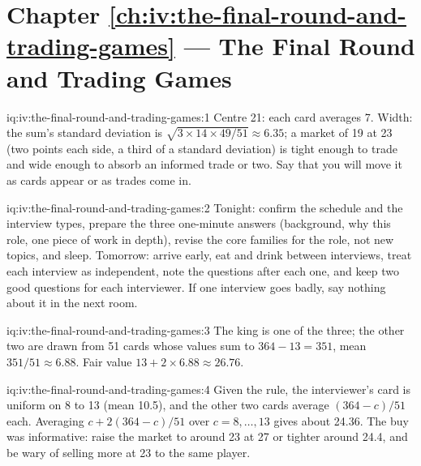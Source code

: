 \section*{Chapter \ref{ch:iv:the-final-round-and-trading-games} --- The Final Round and Trading Games}

\begin{solution}{iq:iv:the-final-round-and-trading-games:1}
Centre 21: each card averages 7. Width: the sum's standard deviation is $\sqrt{3 \times 14 \times 49/51}
\approx 6.35$; a market of 19 at 23 (two points each side, a third of a standard deviation) is tight enough to
trade and wide enough to absorb an informed trade or two. Say that you will move it as cards appear or as
trades come in.
\end{solution}

\begin{solution}{iq:iv:the-final-round-and-trading-games:2}
Tonight: confirm the schedule and the interview types, prepare the three one-minute answers (background, why
this role, one piece of work in depth), revise the core families for the role, not new topics, and sleep.
Tomorrow: arrive early, eat and drink between interviews, treat each interview as independent, note the
questions after each one, and keep two good questions for each interviewer. If one interview goes badly, say
nothing about it in the next room.
\end{solution}

\begin{solution}{iq:iv:the-final-round-and-trading-games:3}
The king is one of the three; the other two are drawn from 51 cards whose values sum to $364 - 13 = 351$, mean
$351/51 \approx 6.88$. Fair value $13 + 2 \times 6.88 \approx 26.76$.
\end{solution}

\begin{solution}{iq:iv:the-final-round-and-trading-games:4}
Given the rule, the interviewer's card is uniform on 8 to 13 (mean 10.5), and the other two cards average
$(364 - c)/51$ each. Averaging $c + 2(364 - c)/51$ over $c = 8, \dots, 13$ gives about 24.36. The buy was
informative: raise the market to around 23 at 27 or tighter around 24.4, and be wary of selling more at 23
to the same player.
\end{solution}

